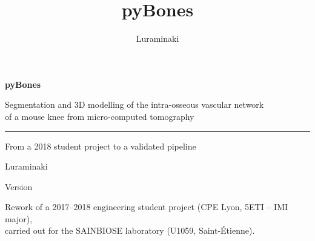 \documentclass[11pt,a4paper,oneside]{report}
\title{pyBones}
\author{Luraminaki}
\begin{document}
\begin{titlepage}
  \centering
  \vspace*{3cm}
  {\Huge\bfseries pyBones\par}
  \vspace{0.8cm}
  {\Large Segmentation and 3D modelling of the intra-osseous vascular network\\
    of a mouse knee from micro-computed tomography\par}
  \vspace{0.6cm}
  \rule{0.6\linewidth}{0.4pt}\par
  \vspace{0.6cm}
  {\large From a 2018 student project to a validated pipeline\par}
  \vfill
  {\large Luraminaki\par}
  \vspace{0.3cm}
  {Version \pbValueVersion\par}
  \vspace{2cm}
  {\small Rework of a 2017--2018 engineering student project (CPE Lyon, 5ETI -- IMI major),\\
    carried out for the SAINBIOSE laboratory (U1059, Saint-Étienne).\par}
\end{titlepage}

\tableofcontents
\clearpage
{}











\appendix

\end{document}
